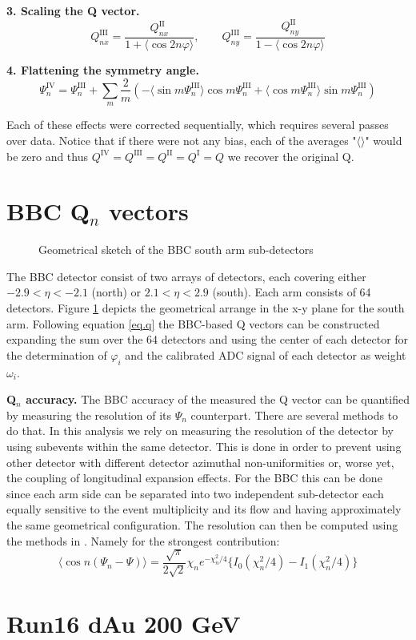 \documentclass{article}
\begin{document}
{\bf 3. Scaling the Q vector.}
\begin{equation}
Q^\mathrm{III}_{nx} = \frac{Q^\mathrm{II}_{nx}}{1+\langle\cos{2n\varphi}\rangle}, \qquad
Q^\mathrm{III}_{ny} = \frac{Q^\mathrm{II}_{ny}}{1-\langle\cos{2n\varphi}\rangle}
\end{equation}

{\bf 4. Flattening the symmetry angle.}
\begin{equation}
\Psi^\mathrm{IV}_{n} = \Psi^\mathrm{III}_{n} + \sum_{m}\frac{2}{m}( -\langle\sin{m\Psi^\mathrm{III}_n}\rangle\cos{m\Psi^\mathrm{III}_n} +\langle\cos{m\Psi^\mathrm{III}_n}\rangle\sin{m\Psi^\mathrm{III}_n})
\end{equation}

Each of these effects were corrected sequentially, which requires several passes over data. Notice that if there were not any bias, each of the averages "$\langle\rangle$" would be zero and thus $Q^\mathrm{IV}=Q^\mathrm{III}=Q^\mathrm{II}=Q^\mathrm{I}=Q$ we recover the original Q.

\section{BBC Q$_n$ vectors}
\begin{figure}
\label{fig.bbcgeo}
\caption{Geometrical sketch of the BBC south arm sub-detectors}
\end{figure}
The BBC detector consist of two arrays of detectors, each covering either $-2.9<\eta<-2.1$ (north) or $2.1<\eta<2.9$ (south).
Each arm consists of 64 detectors. Figure \ref{fig.bbcgeo} depicts the geometrical arrange in the x-y plane for the south arm.
Following equation \ref{eq.q} the BBC-based Q vectors can be constructed expanding the sum over the 64 detectors and using the center of each detector for the determination of $\varphi_i$ and the calibrated ADC signal of each detector as weight $\omega_i$.

{\bf Q$_n$ accuracy.}
The BBC accuracy of the measured the Q vector can be quantified by measuring the resolution of its $\Psi_n$ counterpart.
There are several methods to do that. In this analysis we rely on measuring the resolution of the detector by using subevents within the same detector. This is done in order to prevent using other detector with different detector azimuthal non-uniformities or, worse yet, the coupling of longitudinal expansion effects.
For the BBC this can be done since each arm side can be separated into two independent sub-detector each equally sensitive to the event multiplicity and its flow and having approximately the same geometrical configuration.
The resolution can then be computed using the methods in \cite{PhysRevC.77.034904}. Namely for the strongest contribution:
\begin{equation}
\langle\cos{n(\Psi_n-\Psi)}\rangle = \frac{\sqrt{\pi}}{2\sqrt{2}}\chi_n e^{-\chi_n^2/4}\lbrace I_0(\chi_n^2/4)-I_1(\chi_n^2/4)\rbrace
\end{equation}

\section{Run16 dAu 200 GeV}

{}

\end{document}
